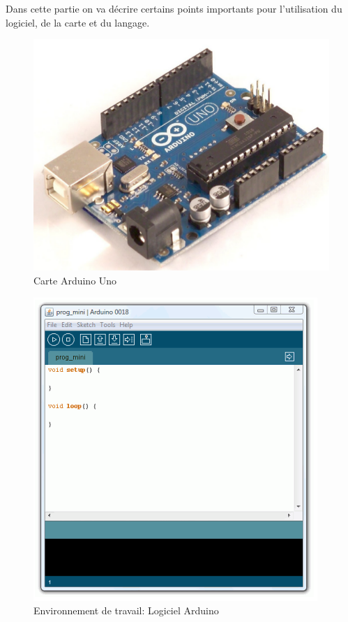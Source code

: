   Dans cette partie on va décrire certains points importants pour l'utilisation du logiciel, de la carte et du langage.

\begin{figure}[h]
\begin{center}
 \includegraphics[scale=0.4]{figure/Arduino/arduinoUno.png}
\caption{Carte Arduino Uno}
\end{center}
\end{figure}


\begin{figure}[h]
\begin{center}
 \includegraphics[scale=0.5]{figure/Arduino/arduinoLogiciel1.png}
\caption{Environnement de travail: Logiciel Arduino}
\end{center}
\end{figure}

